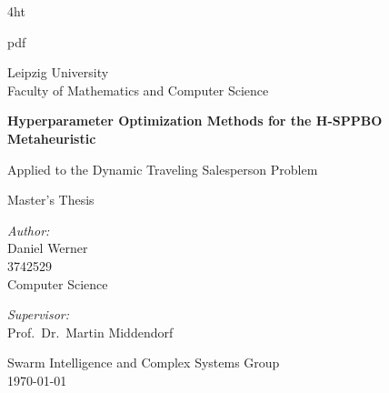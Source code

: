 \documentclass[
  fontsize=12pt,
  a4paper,  %
  twoside,  %
  bibliography=totoc,
  headsepline,
  cleardoublepage=empty,
  parskip=half,
  draft=false
]{scrbook}
\begin{document}
\iftex4ht
  \Configure{$}{\PicMath}{\EndPicMath}{}

  {pdf}
  {%
  }
\fi




\begin{titlepage}
	\begin{center}
		
		
		\Large
		Leipzig University\\
		Faculty of Mathematics and Computer Science
		
		\vspace{2.5cm}
		
		\Huge
		\textbf{Hyperparameter Optimization Methods for the H-SPPBO Metaheuristic}
		
		\vspace{0.5cm}
		\Large
		Applied to the Dynamic Traveling Salesperson Problem
		
		\vspace{1cm}
		
		
		Master's Thesis
		
		\vspace{2cm}

		
		\begin{minipage}{0.4\textwidth}
			\vspace{0.05\linewidth}
			\begin{flushleft} \large
				\emph{Author:}\\
				Daniel Werner\\
				{\small 3742529\\
					\vspace{-0.3cm}
					Computer Science}
			\end{flushleft}
		\end{minipage}
		\begin{minipage}{0.4\textwidth}
			\begin{flushright} \large
				\emph{Supervisor:} \\
				Prof.\ Dr.\ Martin Middendorf\\
				\hfil
			\end{flushright}
		\end{minipage}
		\vfill
		
	
		\large Swarm Intelligence and Complex Systems Group\\
		
		{\large \today}
		
			\end{center}
	\end{titlepage}
\end{document}

